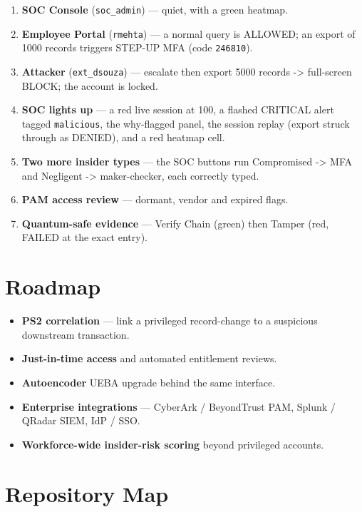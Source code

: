 \documentclass[
]{article}
\providecommand{\tightlist}{%
  \setlength{\itemsep}{0pt}\setlength{\parskip}{0pt}}
\begin{document}
\begin{enumerate}
\def\labelenumi{\arabic{enumi}.}
\tightlist
\item
  \textbf{SOC Console} (\texttt{soc\_admin}) --- quiet, with a green
  heatmap.
\item
  \textbf{Employee Portal} (\texttt{rmehta}) --- a normal query is
  ALLOWED; an export of 1000 records triggers STEP-UP MFA (code
  \texttt{246810}).
\item
  \textbf{Attacker} (\texttt{ext\_dsouza}) --- escalate then export 5000
  records -\textgreater{} full-screen BLOCK; the account is locked.
\item
  \textbf{SOC lights up} --- a red live session at 100, a flashed
  CRITICAL alert tagged \texttt{malicious}, the why-flagged panel, the
  session replay (export struck through as DENIED), and a red heatmap
  cell.
\item
  \textbf{Two more insider types} --- the SOC buttons run Compromised
  -\textgreater{} MFA and Negligent -\textgreater{} maker-checker, each
  correctly typed.
\item
  \textbf{PAM access review} --- dormant, vendor and expired flags.
\item
  \textbf{Quantum-safe evidence} --- Verify Chain (green) then Tamper
  (red, FAILED at the exact entry).
\end{enumerate}

\section{Roadmap}\label{roadmap}

\begin{itemize}
\tightlist
\item
  \textbf{PS2 correlation} --- link a privileged record-change to a
  suspicious downstream transaction.
\item
  \textbf{Just-in-time access} and automated entitlement reviews.
\item
  \textbf{Autoencoder} UEBA upgrade behind the same interface.
\item
  \textbf{Enterprise integrations} --- CyberArk / BeyondTrust PAM,
  Splunk / QRadar SIEM, IdP / SSO.
\item
  \textbf{Workforce-wide insider-risk scoring} beyond privileged
  accounts.
\end{itemize}

\section{Repository Map}\label{repository-map}
\end{document}
